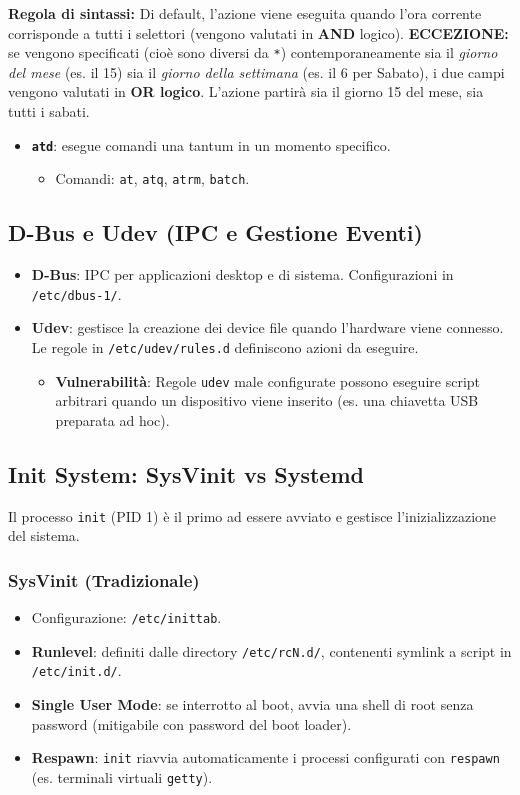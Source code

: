 \documentclass[12pt, a4paper]{report}
\begin{document}
\textbf{Regola di sintassi:} Di default, l'azione viene eseguita quando l'ora corrente corrisponde a tutti i selettori (vengono valutati in \textbf{AND} logico). \textbf{ECCEZIONE:} se vengono specificati (cioè sono diversi da \texttt{*}) contemporaneamente sia il \textit{giorno del mese} (es. il 15) sia il \textit{giorno della settimana} (es. il 6 per Sabato), i due campi vengono valutati in \textbf{OR logico}. L'azione partirà sia il giorno 15 del mese, sia tutti i sabati.

\begin{itemize}
	\item \textbf{\texttt{atd}}: esegue comandi una tantum in un momento specifico.
	\begin{itemize}
		\item Comandi: \texttt{at}, \texttt{atq}, \texttt{atrm}, \texttt{batch}.
	\end{itemize}
\end{itemize}

\subsection{D-Bus e Udev (IPC e Gestione Eventi)}
\begin{itemize}
	\item \textbf{D-Bus}: IPC per applicazioni desktop e di sistema. Configurazioni in \texttt{/etc/dbus-1/}.
	\item \textbf{Udev}: gestisce la creazione dei device file quando l'hardware viene connesso. Le regole in \texttt{/etc/udev/rules.d} definiscono azioni da eseguire.
	\begin{itemize}
		\item \textbf{Vulnerabilità}: Regole \texttt{udev} male configurate possono eseguire script arbitrari quando un dispositivo viene inserito (es. una chiavetta USB preparata ad hoc).
	\end{itemize}
\end{itemize}

\subsection{Init System: SysVinit vs Systemd}
Il processo \texttt{init} (PID 1) è il primo ad essere avviato e gestisce l'inizializzazione del sistema.

\subsubsection{SysVinit (Tradizionale)}
\begin{itemize}
	\item Configurazione: \texttt{/etc/inittab}.
	\item \textbf{Runlevel}: definiti dalle directory \texttt{/etc/rcN.d/}, contenenti symlink a script in \texttt{/etc/init.d/}.
	\item \textbf{Single User Mode}: se interrotto al boot, avvia una shell di root senza password (mitigabile con password del boot loader).
	\item \textbf{Respawn}: \texttt{init} riavvia automaticamente i processi configurati con \texttt{respawn} (es. terminali virtuali \texttt{getty}).
\end{itemize}
\end{document}
